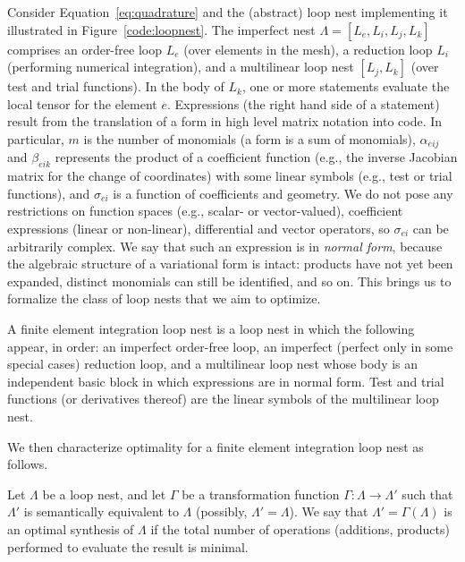 Consider Equation~\ref{eq:quadrature} and the (abstract) loop nest implementing it illustrated in Figure~\ref{code:loopnest}. The imperfect nest $\Lambda=[L_e, L_i, L_j, L_k]$ comprises an order-free loop $L_e$ (over elements in the mesh), a reduction loop $L_i$ (performing numerical integration), and a multilinear loop nest $[L_j, L_k]$ (over test and trial functions). In the body of $L_k$, one or more statements evaluate the local tensor for the element $e$. Expressions (the right hand side of a statement) result from the translation of a form in high level matrix notation into code. In particular, $m$ is the number of monomials (a form is a sum of monomials), $\alpha_{eij}$ and $\beta_{eik}$ represents the product of a coefficient function (e.g., the inverse Jacobian matrix for the change of coordinates) with some linear symbols (e.g., test or trial functions), and $\sigma_{ei}$ is a function of coefficients and geometry. We do not pose any restrictions on function spaces (e.g., scalar- or vector-valued), coefficient expressions (linear or non-linear), differential and vector operators, so $\sigma_{ei}$ can be arbitrarily complex. We say that such an expression is in \textit{normal form}, because the algebraic structure of a variational form is intact: products have not yet been expanded, distinct monomials can still be identified, and so on. This brings us to formalize the class of loop nests that we aim to optimize.


\begin{Def}
\label{def:fem-loopnest}
A finite element integration loop nest is a loop nest in which the following appear, in order: an imperfect order-free loop, an imperfect (perfect only in some special cases) reduction loop, and a multilinear loop nest whose body is an independent basic block in which expressions are in normal form. Test and trial functions (or derivatives thereof) are the linear symbols of the multilinear loop nest.
\end{Def}

We then characterize optimality for a finite element integration loop nest as follows.

\begin{Def}
\label{def:mln-optimality}
Let $\Lambda$ be a loop nest, and let $\Gamma$ be a transformation function $\Gamma : \Lambda \rightarrow \Lambda'$ such that $\Lambda'$ is semantically equivalent to $\Lambda$ (possibly, $\Lambda' = \Lambda$). We say that $\Lambda' = \Gamma (\Lambda)$ is an optimal synthesis of $\Lambda$ if the total number of operations (additions, products) performed to evaluate the result is minimal.
\end{Def}

